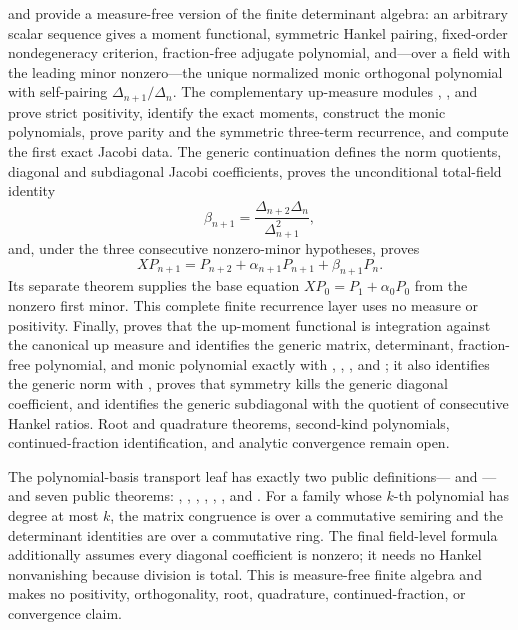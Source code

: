 \documentclass[11pt]{article}
\theoremstyle{definition}
\theoremstyle{remark}
\begin{document}
\begin{remark}
 and  provide a
measure-free version of the finite determinant algebra: an arbitrary scalar
sequence gives a moment functional, symmetric Hankel pairing, fixed-order
nondegeneracy criterion, fraction-free adjugate polynomial, and---over a field
with the leading minor nonzero---the unique normalized monic orthogonal
polynomial with self-pairing \(\Delta_{n+1}/\Delta_n\).  The complementary
up-measure modules ,
, and  prove
strict positivity, identify the exact moments, construct the monic
polynomials, prove parity and the symmetric three-term recurrence, and compute
the first exact Jacobi data.  The generic continuation
 defines the norm quotients, diagonal and
subdiagonal Jacobi coefficients, proves the unconditional total-field identity
\[
 \beta_{n+1}=\frac{\Delta_{n+2}\Delta_n}{\Delta_{n+1}^2},
\]
and, under the three consecutive nonzero-minor hypotheses, proves
\[
 XP_{n+1}=P_{n+2}+\alpha_{n+1}P_{n+1}+\beta_{n+1}P_n.
\]
Its separate theorem
 supplies the base equation
$XP_0=P_1+\alpha_0P_0$ from the nonzero first minor.  This complete finite
recurrence layer uses no measure or positivity.  Finally,
 proves that
the up-moment functional is integration against the canonical up measure and
identifies the generic matrix, determinant, fraction-free polynomial, and
monic polynomial exactly with , ,
, and ; it also identifies
the generic norm with , proves that symmetry kills the
generic diagonal coefficient, and identifies the generic subdiagonal with the
quotient of consecutive Hankel ratios.  Root and
quadrature theorems, second-kind polynomials, continued-fraction
identification, and analytic convergence remain open.

The polynomial-basis transport leaf
 has exactly two public
definitions--- and
---and seven public theorems:
,
,
,
,
,
, and
.
For a family whose \(k\)-th polynomial has degree at most \(k\), the matrix
congruence is over a commutative semiring and the determinant identities are
over a commutative ring.  The final field-level formula additionally assumes
every diagonal coefficient is nonzero; it needs no Hankel nonvanishing because
division is total.  This is measure-free finite algebra and makes no
positivity, orthogonality, root, quadrature, continued-fraction, or convergence
claim.


\end{remark}
\end{document}

